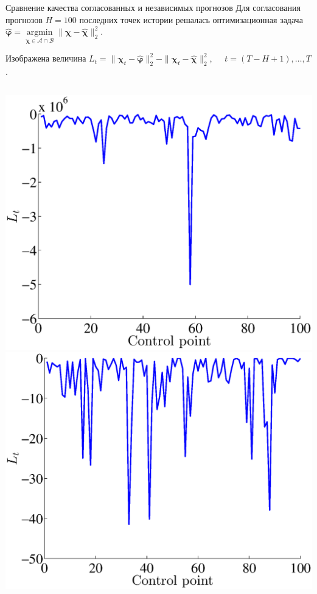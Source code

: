 \documentclass{beamer}
\newcommand\argmin{\mathop{\arg\min}}
\newcommand{\A}{\mathcal{A}}
\newcommand{\hchi}{\hat{\boldsymbol{\chi}}}
\newcommand{\hphi}{\hat{\boldsymbol{\varphi}}}
\newcommand{\B}{\mathcal{B}}
\begin{document}
\begin{frame}{Сравнение качества согласованных и независимых прогнозов}
    \small
    Для согласования прогнозов $H = 100$ последних точек истории
    решалась оптимизационная задача
    $\hphi = \argmin\limits_{\boldsymbol{\chi} \in \A \cap \B} \|
    \boldsymbol{\chi} - \hchi \|^2_2.$
    \vspace{0.2cm}

    Изображена величина
    $L_t = \| \boldsymbol{\chi}_t - \hphi \|^2_2 - \|
    \boldsymbol{\chi}_t - \hchi \|^2_2$,~~~$t = (T - H + 1), \ldots, T$.
    \begin{columns}[c]
			\includegraphics[width=\textwidth]{QualityImprovingRailRoads.eps}\\		
        	\includegraphics[width=\textwidth]{QualityImprovingEnergy.eps}\\
    \end{columns}
    
    \bigskip
    \centering{\textcolor[rgb]{1.00,0.00,0.00}{Во всех контрольных точках потери уменьшились.}}
\end{frame}
\end{document}
